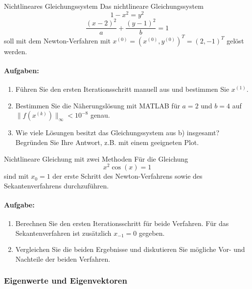 \begin{example2}{Nichtlineares Gleichungssystem}
Das nichtlineare Gleichungssystem
$$1 - x^2 = y^2$$
$$\frac{(x-2)^2}{a} + \frac{(y-1)^2}{b} = 1$$
soll mit dem Newton-Verfahren mit $x^{(0)} = (x^{(0)}, y^{(0)})^T = (2,-1)^T$ gelöst werden.

\paragraph{Aufgaben:}
\begin{enumerate}
    \item Führen Sie den ersten Iterationsschritt manuell aus und bestimmen Sie $x^{(1)}$.
    
    \item Bestimmen Sie die Näherungslösung mit MATLAB für $a = 2$ und $b = 4$ auf $\|f(x^{(k)})\|_\infty < 10^{-8}$ genau.
    
    \item Wie viele Lösungen besitzt das Gleichungssystem aus b) insgesamt? Begründen Sie Ihre Antwort, z.B. mit einem geeigneten Plot.
\end{enumerate}
\end{example2}

\begin{example2}{Nichtlineare Gleichung mit zwei Methoden}
Für die Gleichung
$$x^2\cos(x) = 1$$
sind mit $x_0 = 1$ der erste Schritt des Newton-Verfahrens sowie des Sekantenverfahrens durchzuführen.

\paragraph{Aufgabe:}
\begin{enumerate}
    \item Berechnen Sie den ersten Iterationsschritt für beide Verfahren. Für das Sekantenverfahren ist zusätzlich $x_{-1} = 0$ gegeben.
    
    \item Vergleichen Sie die beiden Ergebnisse und diskutieren Sie mögliche Vor- und Nachteile der beiden Verfahren.
\end{enumerate}
\end{example2}

\subsubsection{Eigenwerte und Eigenvektoren}

